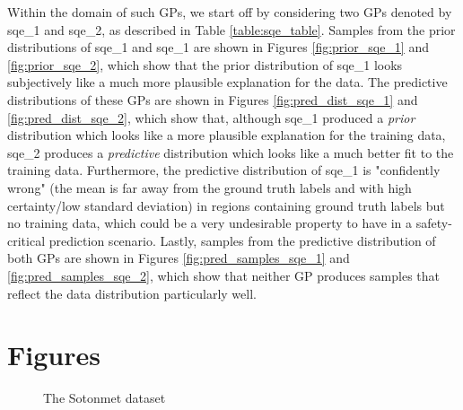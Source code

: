 \documentclass{article}
\begin{document}
Within the domain of such GPs, we start off by considering two GPs denoted by sqe\_1 and sqe\_2, as described in Table \ref{table:sqe_table}. Samples from the prior distributions of sqe\_1 and sqe\_1 are shown in Figures \ref{fig:prior_sqe_1} and \ref{fig:prior_sqe_2}, which show that the prior distribution of sqe\_1 looks subjectively like a much more plausible explanation for the data. The predictive distributions of these GPs are shown in Figures \ref{fig:pred_dist_sqe_1} and \ref{fig:pred_dist_sqe_2}, which show that, although sqe\_1 produced a \emph{prior} distribution which looks like a more plausible explanation for the training data, sqe\_2 produces a \emph{predictive} distribution which looks like a much better fit to the training data. Furthermore, the predictive distribution of sqe\_1 is "confidently wrong" (the mean is far away from the ground truth labels and with high certainty/low standard deviation) in regions containing ground truth labels but no training data, which could be a very undesirable property to have in a safety-critical prediction scenario. Lastly, samples from the predictive distribution of both GPs are shown in Figures \ref{fig:pred_samples_sqe_1} and \ref{fig:pred_samples_sqe_2}, which show that neither GP produces samples that reflect the data distribution particularly well.

\appendix

\section{Figures}\label{appendix:figures}


\begin{figure}[pht]
    \centering
    \caption{The Sotonmet dataset}
    \label{fig:sotonmet}
\end{figure}
\end{document}
